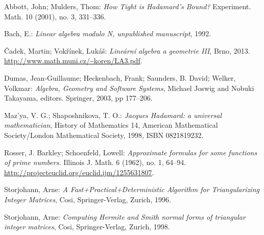 \begin{thebibliography}{10}

Abbott, John; Mulders, Thom: \textit{How Tight is Hadamard's Bound?}
Experiment. Math. 10 (2001), no. 3, 331--336.

Bach, E.: \textit{Linear algebra modulo N, unpublished manuscript}, 1992.

Čadek, Martin; Vokřínek, Lukáš: \textit{Lineární algebra a geometrie III},
Brno,  2013. \url{http://www.math.muni.cz/~koren/LA3.pdf}.

Dumas, Jean-Guillaume; Heckenbach, Frank; Saunders, B. David; Welker, Volkmar:
\textit{Algebra, Geometry and Software Systems}, Michael Joswig and Nobuki Takayama, editors. Springer, 2003, pp 177--206.

Maz'ya, V. G.; Shaposhnikova, T. O.: \textit{Jacques Hadamard: a universal mathematician},
History of Mathematics 14, American Mathematical Society/London Mathematical Society, 1998, ISBN 0821819232.

Rosser, J. Barkley; Schoenfeld, Lowell: \textit{Approximate formulas for some functions of prime numbers.}
Illinois J. Math. 6 (1962), no. 1, 64--94. 
\url{http://projecteuclid.org/euclid.ijm/1255631807}.

Storjohann, Arne: \textit{A Fast+Practical+Deterministic Algorithm for Triangularizing Integer Matrices},
Cosi, Springer-Verlag, Zurich, 1996.

Storjohann, Arne: \textit{Computing Hermite and Smith normal forms
of triangular integer matrices},
Cosi, Springer-Verlag, Zurich, 1998.


\end{thebibliography}

\cleardoublepage
